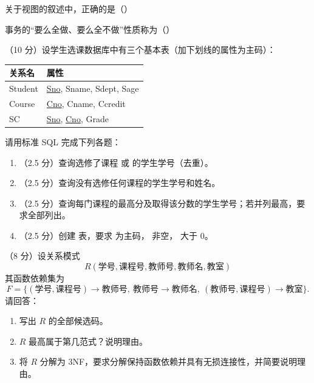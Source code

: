 \documentclass[a4paper,11pt]{article}
\begin{document}
\q 关于视图的叙述中，正确的是（\quad）

\q 事务的“要么全做、要么全不做”性质称为（\quad）


\q （10 分）设学生选课数据库中有三个基本表（加下划线的属性为主码）：
\begin{center}\small
\begin{tabular}{ll}
\toprule
关系名 & 属性 \\
\midrule
Student & \underline{Sno}, Sname, Sdept, Sage \\
Course & \underline{Cno}, Cname, Ccredit \\
SC & \underline{Sno}, \underline{Cno}, Grade \\
\bottomrule
\end{tabular}
\end{center}
请用标准 SQL 完成下列各题：
\begin{enumerate}[label=（\arabic*）, leftmargin=2.4em, itemsep=1pt]
  \item （2.5 分）查询选修了课程  或  的学生学号（去重）。
  \item （2.5 分）查询没有选修任何课程的学生学号和姓名。
  \item （2.5 分）查询每门课程的最高分及取得该分数的学生学号；若并列最高，要求全部列出。
  \item （2.5 分）创建  表，要求  为主码， 非空， 大于 0。
\end{enumerate}
\anslines{9cm}

\q （8 分）设关系模式
\[
R(\text{学号},\text{课程号},\text{教师号},\text{教师名},\text{教室})
\]
其函数依赖集为
\[
F=\{(\text{学号},\text{课程号})\to\text{教师号},\ \text{教师号}\to\text{教师名},\ (\text{教师号},\text{课程号})\to\text{教室}\}.
\]
请回答：
\begin{enumerate}[label=（\arabic*）, leftmargin=2.4em, itemsep=1pt]
  \item 写出 $R$ 的全部候选码。
  \item $R$ 最高属于第几范式？说明理由。
  \item 将 $R$ 分解为 3NF，要求分解保持函数依赖并具有无损连接性，并简要说明理由。
\end{enumerate}
\anslines{7cm}
\end{document}
